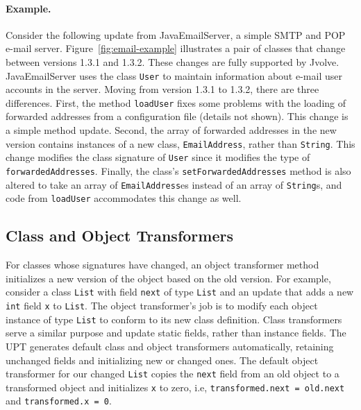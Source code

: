 \documentclass[9pt]{sigplanconf}
\newcommand{\DSU}{{\sc Jvolve}}
\begin{document}
\paragraph{Example.} 
Consider the following update from JavaEmailServer, a simple SMTP and
POP e-mail server.  Figure~\ref{fig:email-example}
illustrates a 
pair of classes that change between versions 1.3.1 and 1.3.2.  These
changes are fully supported by \DSU.  JavaEmailServer uses the class
{\tt User} to maintain information about e-mail user accounts in the
server.  Moving from version 1.3.1 to 1.3.2, there are three
differences.  First, the method {\tt loadUser} fixes some problems
with the loading of forwarded addresses from a configuration file
(details not shown).  This change is a simple method update.  Second,
the array of forwarded addresses in the new version contains instances of a new
class, {\tt EmailAddress}, rather than {\tt String}.  This change modifies
the class signature of {\tt User} since it modifies the type of
{\tt forwardedAddresses}.  Finally, the class's
{\tt setForwardedAddresses} method is also altered to take an array of
{\tt EmailAddress}es instead of an array of {\tt String}s, and
code from {\tt loadUser} accommodates this change as well.


\subsection{Class and Object Transformers}
\label{subsec:transformers}

For classes whose signatures have changed, an object transformer
method  initializes a new version of the object based on the
old version.  For example, consider a class \texttt{List} with field
\texttt{next} of type \texttt{List} and an update that adds a new
\texttt{int} field {\tt x} to \texttt{List}. The object transformer's
job is to modify each object instance of type \texttt{List} to conform
to its new class definition. Class transformers serve a similar
purpose and update static fields, rather than instance
fields.  The \ac{UPT} generates default class and object transformers
automatically, retaining unchanged fields and initializing new or
changed ones.  The default object transformer for our changed
\texttt{List} copies the \texttt{next} field from an old object to a
transformed object and initializes {\tt x} to zero, i.e,
\texttt{transformed.next = old.next} and \texttt{transformed.x = 0}.
\end{document}

